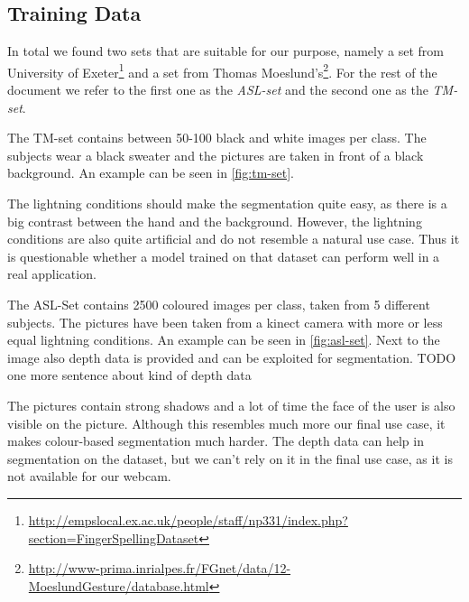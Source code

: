 \documentclass[letterpaper, 10 pt, conference]{ieeeconf}  %
\begin{document}
\subsection{Training Data}

In total we found two sets that are suitable for our purpose, namely a set from University of Exeter\footnote{\url{http://empslocal.ex.ac.uk/people/staff/np331/index.php?section=FingerSpellingDataset}} and a set from Thomas Moeslund's\footnote{\url{http://www-prima.inrialpes.fr/FGnet/data/12-MoeslundGesture/database.html}}. For the rest of the document we refer to the first one as the \textit{ASL-set} and the second one as the \textit{TM-set}.

The TM-set contains between 50-100 black and white images per class. The subjects wear a black sweater and the pictures are taken in front of a black background. An example can be seen in \autoref{fig:tm-set}.

The lightning conditions should make the segmentation quite easy, as there is a big contrast between the hand and the background. However, the lightning conditions are also quite artificial and do not resemble a natural use case. Thus it is questionable whether a model trained on that dataset can perform well in a real application.

The ASL-Set contains 2500 coloured images per class, taken from 5 different subjects. The pictures have been taken from a kinect camera with more or less equal lightning conditions. An example can be seen in \autoref{fig:asl-set}. Next to the image also depth data is provided and can be exploited for segmentation. TODO one more sentence about kind of depth data

The pictures contain strong shadows and a lot of time the face of the user is also visible on the picture. Although this resembles much more our final use case, it makes colour-based segmentation much harder. The depth data can help in segmentation on the dataset, but we can't rely on it in the final use case, as it is not available for our webcam.
\end{document}
